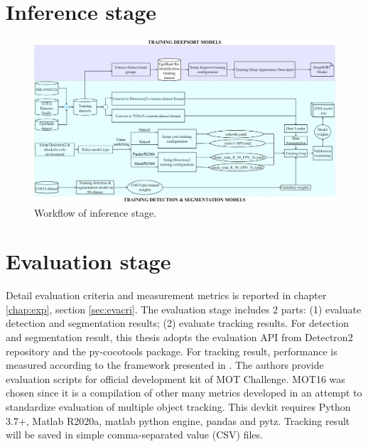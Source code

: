 \section{Inference stage}\label{sec:inferstage}
\begin{figure}[htbp]
	\centerline{\includegraphics[width=1\linewidth]{Figs/trainingStage.png}}
	\caption{Workflow of inference stage.}
	\label{fig:inferstage}
\end{figure}
\section{Evaluation stage}
Detail evaluation criteria and measurement metrics is reported in chapter \ref{chap:exp}, section \ref{sec:evacri}. The evaluation stage includes 2 parts: (1) evaluate detection and segmentation results; (2) evaluate tracking results. For detection and segmentation result, this thesis adopts the evaluation API from Detectron2 repository and the py-cocotools package. For tracking result, performance is measured according to the framework presented in \cite{DBLP:journals/corr/MilanL0RS16}. The authors provide evaluation scripts for official development kit of MOT Challenge. MOT16 was chosen since it is a compilation of other many metrics developed in an attempt to standardize evaluation of multiple object tracking. This devkit requires Python 3.7+, Matlab R2020a, matlab python engine, pandas and pytz. Tracking result will be saved in simple comma-separated value (CSV) files.